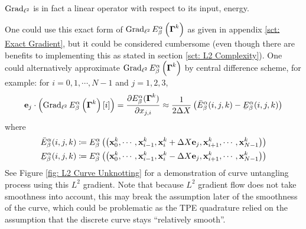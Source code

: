 \documentclass[../dissertation.tex]{subfiles}
\begin{document}
\begin{remark}
    $\operatorname{Grad}_{\ell^2}$ is in fact a linear operator with respect to its input, energy.
\end{remark}

One could use this exact form of $\operatorname{Grad}_{\ell^2} E_{\beta}^{\alpha} \left( \boldsymbol{\Gamma}^k \right)$ as given in appendix \ref{sct: Exact Gradient}, but it could be considered cumbersome (even though there are benefits to implementing this as stated in section \ref{sct: L2 Complexity}).
One could alternatively approximate $\operatorname{Grad}_{\ell^2} E_{\beta}^{\alpha} \left( \boldsymbol{\Gamma}^k \right)$ by central difference scheme, for example:
for $i=0,1,\cdots,N-1$ and $j = 1,2,3$,
\begin{equation}
    \ebf_j \cdot \left( \Grad_{\ell^2} E_{\beta}^{\alpha} \left( \Gammabf^k \right) [i] \right)
    =
    \frac{\partial E_{\beta}^{\alpha} (\Gammabf^k)}{\partial x_{j,i}}
    \approx
    \frac{1}{2 \Delta X} \left( 
        \bar{E}_{\beta}^{\alpha} (i, j, k)
        -
        \underaccent{\bar} E_{\beta}^{\alpha} (i, j, k)
    \right)
\end{equation}
where
\begin{align*}
    \bar{E}_{\beta}^{\alpha} (i, j, k) &\coloneqq E_{\beta}^{\alpha} \left( \left( \xbf_0^k, \cdots, \xbf_{i-1}^k, \xbf_i^k + \Delta X \ebf_{j}, \xbf_{i+1}^k, \cdots, \xbf_{N-1}^k\right) \right) \\
    \underaccent{\bar}{E}_{\beta}^{\alpha} (i, j, k) &\coloneqq E_{\beta}^{\alpha} \left( \left( \xbf_0^k, \cdots, \xbf_{i-1}^k, \xbf_i^k - \Delta X \ebf_{j}, \xbf_{i+1}^k, \cdots, \xbf_{N-1}^k\right) \right)
\end{align*}
See Figure \ref{fig: L2 Curve Unknotting} for a demonstration of curve untangling process using this $L^2$ gradient.
Note that because $L^2$ gradient flow does not take smoothness into account, this may break the assumption later of the smoothness of the curve,
which could be problematic as the TPE quadrature relied on the assumption that the discrete curve stays ``relatively smooth''.
\end{document}
